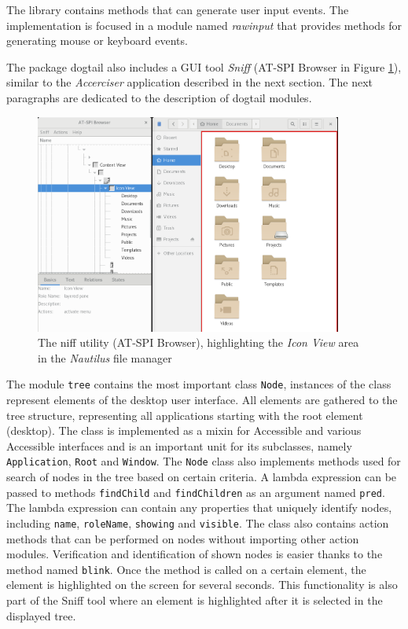 The library contains methods that can generate user input events. The implementation is focused in a module named \textit{rawinput} that provides methods for generating mouse or keyboard events.

The package dogtail also includes a GUI tool \textit{Sniff} (AT-SPI Browser in Figure \ref{sniff}), similar to the \textit{Accerciser} application described in the next section. The next paragraphs are dedicated to the description of dogtail modules.

\begin{figure}[h]
	\centering
	\includegraphics[width=0.9\textwidth]{obrazky-figures/sniff.png}
	\caption{The niff utility (AT-SPI Browser), highlighting the \textit{Icon View} area in the \textit{Nautilus} file manager}
	\label{sniff}
\end{figure}

The module \texttt{tree} contains the most important class \texttt{Node}, instances of the class represent elements of the desktop user interface. All elements are gathered to the tree structure, representing all applications starting with the root element (desktop). The class is implemented as a mixin for Accessible and various Accessible interfaces and is an important unit for its subclasses, namely \texttt{Application}, \texttt{Root} and \texttt{Window}. The \texttt{Node} class also implements methods used for search of nodes in the tree based on certain criteria. A lambda expression can be passed to methods \texttt{findChild} and \texttt{findChildren} as an argument named \texttt{pred}. The lambda expression can contain any properties that uniquely identify nodes, including \texttt{name}, \texttt{roleName},  \texttt{showing} and \texttt{visible}. The class also contains action methods that can be performed on nodes without importing other action modules. Verification and identification of shown nodes is easier thanks to the method named \texttt{blink}. Once the method is called on a certain element, the element is highlighted on the screen for several seconds. This functionality is also part of the Sniff tool where an element is highlighted after it is selected in the displayed tree.

